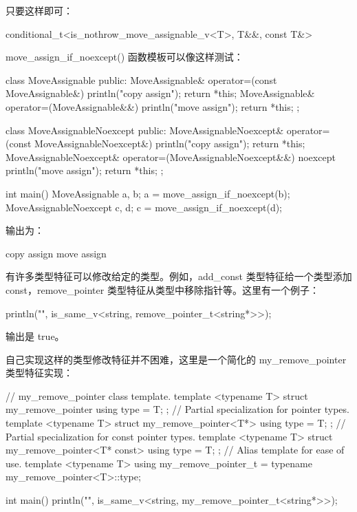 只要这样即可：

\begin{cpp}
conditional_t<is_nothrow_move_assignable_v<T>, T&&, const T&>
\end{cpp}

move\_assign\_if\_noexcept() 函数模板可以像这样测试：

\begin{cpp}
class MoveAssignable
{
    public:
        MoveAssignable& operator=(const MoveAssignable&) {
            println("copy assign"); return *this; }
        MoveAssignable& operator=(MoveAssignable&&) {
            println("move assign"); return *this; }
};

class MoveAssignableNoexcept
{
    public:
        MoveAssignableNoexcept& operator=(const MoveAssignableNoexcept&) {
            println("copy assign"); return *this; }
        MoveAssignableNoexcept& operator=(MoveAssignableNoexcept&&) noexcept {
            println("move assign"); return *this; }
};

int main()
{
    MoveAssignable a, b;
    a = move_assign_if_noexcept(b);
    MoveAssignableNoexcept c, d;
    c = move_assign_if_noexcept(d);
}
\end{cpp}

输出为：

\begin{shell}
copy assign
move assign
\end{shell}


有许多类型特征可以修改给定的类型。例如，add\_const 类型特征给一个类型添加 const，remove\_pointer 类型特征从类型中移除指针等。这里有一个例子：

\begin{cpp}
println("{}", is_same_v<string, remove_pointer_t<string*>>);
\end{cpp}

输出是 true。

自己实现这样的类型修改特征并不困难，这里是一个简化的 my\_remove\_pointer 类型特征实现：

\begin{cpp}
// my_remove_pointer class template.
template <typename T> struct my_remove_pointer { using type = T; };
// Partial specialization for pointer types.
template <typename T> struct my_remove_pointer<T*> { using type = T; };
// Partial specialization for const pointer types.
template <typename T> struct my_remove_pointer<T* const> { using type = T; };
// Alias template for ease of use.
template <typename T>
using my_remove_pointer_t = typename my_remove_pointer<T>::type;

int main()
{
    println("{}", is_same_v<string, my_remove_pointer_t<string*>>);
}
\end{cpp}

